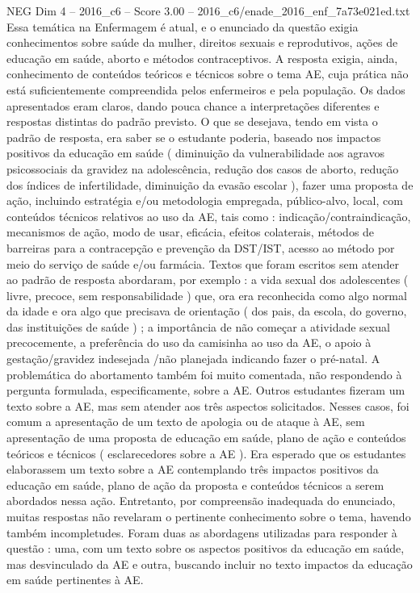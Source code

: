 \begin{textsample}{NEG Dim 4 – 2016\_c6 – Score 3.00 – 2016\_c6/enade\_2016\_enf\_7a73e021ed.txt}
Essa temática na Enfermagem é atual, e o enunciado da questão exigia conhecimentos sobre saúde da mulher, direitos sexuais e reprodutivos, ações de educação em saúde, aborto e métodos contraceptivos.
A resposta exigia, ainda, conhecimento de conteúdos teóricos e técnicos sobre o tema AE, cuja prática não está suficientemente compreendida pelos enfermeiros e pela população.
Os dados apresentados eram claros, dando pouca chance a interpretações diferentes e respostas distintas do padrão previsto.
O que se desejava, tendo em vista o padrão de resposta, era saber se o estudante poderia, baseado nos impactos positivos da educação em saúde ( diminuição da vulnerabilidade aos agravos psicossociais da gravidez na adolescência, redução dos casos de aborto, redução dos índices de infertilidade, diminuição da evasão escolar ), fazer uma proposta de ação, incluindo estratégia e/ou metodologia empregada, público-alvo, local, com conteúdos técnicos relativos ao uso da AE, tais como : indicação/contraindicação, mecanismos de ação, modo de usar, eficácia, efeitos colaterais, métodos de barreiras para a contracepção e prevenção da DST/IST, acesso ao método por meio do serviço de saúde e/ou farmácia.
Textos que foram escritos sem atender ao padrão de resposta abordaram, por exemplo : a vida sexual dos adolescentes ( livre, precoce, sem responsabilidade ) que, ora era reconhecida como algo normal da idade e ora algo que precisava de orientação ( dos pais, da escola, do governo, das instituições de saúde ) ; a importância de não começar a atividade sexual precocemente, a preferência do uso da camisinha ao uso da AE, o apoio à gestação/gravidez indesejada /não planejada indicando fazer o pré-natal.
A problemática do abortamento também foi muito comentada, não respondendo à pergunta formulada, especificamente, sobre a AE.
Outros estudantes fizeram um texto sobre a AE, mas sem atender aos três aspectos solicitados.
Nesses casos, foi comum a apresentação de um texto de apologia ou de ataque à AE, sem apresentação de uma proposta de educação em saúde, plano de ação e conteúdos teóricos e técnicos ( esclarecedores sobre a AE ).
Era esperado que os estudantes elaborassem um texto sobre a AE contemplando três impactos positivos da educação em saúde, plano de ação da proposta e conteúdos técnicos a serem abordados nessa ação.
Entretanto, por compreensão inadequada do enunciado, muitas respostas não revelaram o pertinente conhecimento sobre o tema, havendo também incompletudes.
Foram duas as abordagens utilizadas para responder à questão : uma, com um texto sobre os aspectos positivos da educação em saúde, mas desvinculado da AE e outra, buscando incluir no texto impactos da educação em saúde pertinentes à AE.

\end{textsample}
